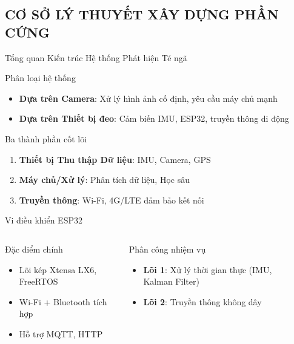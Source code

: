 
\subsection{CƠ SỞ LÝ THUYẾT XÂY DỰNG PHẦN CỨNG}

\begin{frame}{Tổng quan Kiến trúc Hệ thống Phát hiện Té ngã}
\begin{block}{Phân loại hệ thống}
\begin{itemize}
\item \textbf{Dựa trên Camera}: Xử lý hình ảnh cố định, yêu cầu máy chủ mạnh
\item \textbf{Dựa trên Thiết bị đeo}: Cảm biến IMU, ESP32, truyền thông di động
\end{itemize}
\end{block}

\begin{block}{Ba thành phần cốt lõi}
\begin{enumerate}
\item \textbf{Thiết bị Thu thập Dữ liệu}: IMU, Camera, GPS
\item \textbf{Máy chủ/Xử lý}: Phân tích dữ liệu, Học sâu
\item \textbf{Truyền thông}: Wi-Fi, 4G/LTE đảm bảo kết nối
\end{enumerate}
\end{block}
\end{frame}

\begin{frame}{Vi điều khiển ESP32}
\begin{columns}
\begin{block}{Đặc điểm chính}
\begin{itemize}
\item Lõi kép Xtensa LX6, FreeRTOS
\item Wi-Fi + Bluetooth tích hợp
\item Hỗ trợ MQTT, HTTP
\end{itemize}
\end{block}

\begin{block}{Phân công nhiệm vụ}
\begin{itemize}
\item \textbf{Lõi 1}: Xử lý thời gian thực (IMU, Kalman Filter)
\item \textbf{Lõi 2}: Truyền thông không dây
\end{itemize}
\end{block}

\begin{center}
\end{center}
\end{columns}
\end{frame}

